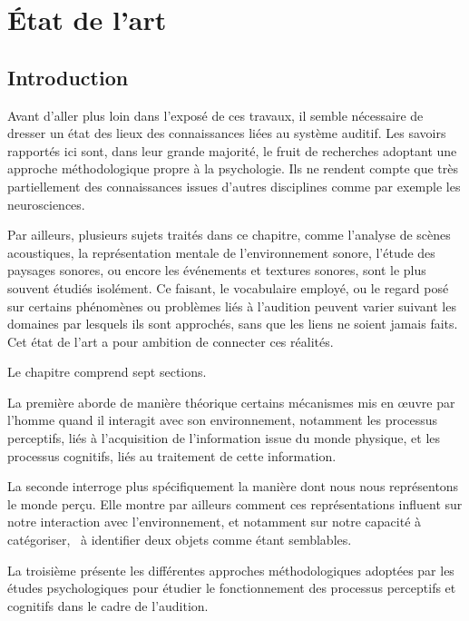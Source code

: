 \chapter{État de l'art}\label{ch:psycho_ea}

\section{Introduction}

Avant d'aller plus loin dans l'exposé de ces travaux, il semble nécessaire de dresser un état des lieux des connaissances liées au système auditif. Les savoirs rapportés ici sont, dans leur grande majorité, le fruit de recherches adoptant une approche méthodologique propre à la psychologie. Ils ne rendent compte que très partiellement des connaissances issues d'autres disciplines comme par exemple les neurosciences.

Par ailleurs, plusieurs sujets traités dans ce chapitre, comme l'analyse de scènes acoustiques, la représentation mentale de l'environnement sonore, l'étude des paysages sonores, ou encore les événements et textures sonores, sont le plus souvent étudiés isolément. Ce faisant, le vocabulaire employé, ou le regard posé sur certains phénomènes ou problèmes liés à l'audition peuvent varier suivant les domaines par lesquels ils sont approchés, sans que les liens ne soient jamais faits. Cet état de l'art a pour ambition de connecter ces réalités.

Le chapitre comprend sept sections.

La première aborde de manière théorique certains mécanismes mis en œuvre par l'homme quand il interagit avec son environnement, notamment les processus perceptifs, liés à l'acquisition de l'information issue du monde physique, et les processus cognitifs, liés au traitement de cette information.

La seconde interroge plus spécifiquement la manière dont nous nous représentons le monde perçu. Elle montre par ailleurs comment ces représentations influent sur notre interaction avec l'environnement, et notamment sur notre capacité à catégoriser, \ie~à identifier deux objets comme étant semblables.

La troisième présente les différentes approches méthodologiques adoptées par les études psychologiques pour étudier le fonctionnement des processus perceptifs et cognitifs dans le cadre de l'audition.

